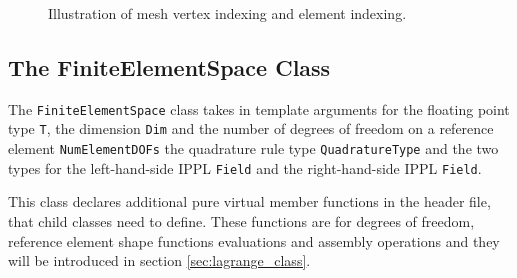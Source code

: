 \begin{figure}[h]
    \centering

    \caption{Illustration of mesh vertex indexing and element indexing.}
    \label{fig:mesh}
\end{figure}

\subsection{The FiniteElementSpace Class}

The \texttt{FiniteElementSpace} class takes in template arguments for the floating point type \texttt{T},
the dimension \texttt{Dim} and the number of degrees of freedom on a reference element \texttt{NumElementDOFs}
the quadrature rule type \texttt{QuadratureType} and the two types for the left-hand-side IPPL \texttt{Field} and the right-hand-side IPPL \texttt{Field}.

This class declares additional pure virtual member functions in the header file, that child classes
need to define. These functions are for degrees of freedom, reference element shape functions evaluations and assembly operations and they
will be introduced in section \ref{sec:lagrange_class}.

